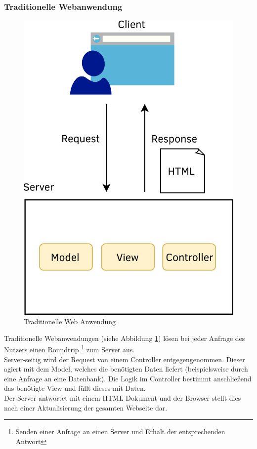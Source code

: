 \subsubsection{Traditionelle Webanwendung}
\begin{figure}
  \begin{center}
    \includegraphics[scale=1]{images/traditonal_web_app.png}
  \end{center}
  \caption{Traditionelle Web Anwendung}
  \label{fig:tradweb}
\end{figure}
Traditionelle Webanwendungen (siehe Abbildung \ref{fig:tradweb}) lösen bei jeder Anfrage des Nutzers einen Roundtrip \footnote{Senden einer Anfrage an einen Server und Erhalt der entsprechenden Antwort} zum Server aus.\\
Server-seitig wird der Request von einem Controller entgegengenommen. Dieser agiert mit dem Model, welches die benötigten Daten liefert (beispielsweise durch eine Anfrage an eine Datenbank). Die Logik im Controller bestimmt anschließend das benötigte View und füllt dieses mit Daten.\\
Der Server antwortet mit einem \ac{HTML} Dokument und der Browser stellt dies nach einer Aktualisierung der gesamten Webseite dar.
